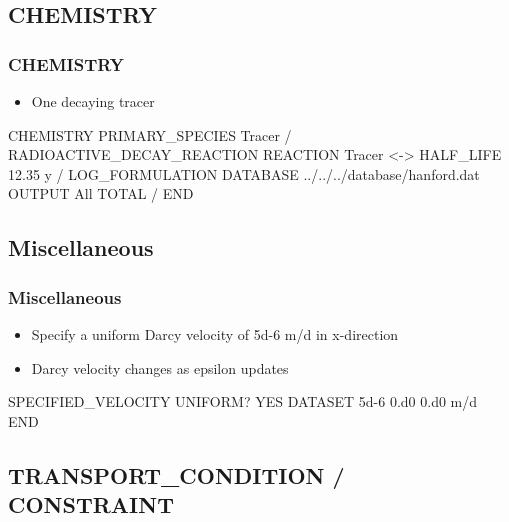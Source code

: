 \documentclass{beamer}
\begin{document}
\subsection{CHEMISTRY}

\begin{frame}\frametitle{CHEMISTRY}

\begin{itemize}
\item One decaying tracer
\end{itemize}

\begin{semiverbatim}
CHEMISTRY
  PRIMARY_SPECIES
     Tracer
  /
  RADIOACTIVE_DECAY_REACTION
    REACTION Tracer <->
    HALF_LIFE 12.35 y
  /
  LOG_FORMULATION
  DATABASE ../../../database/hanford.dat
  OUTPUT
    All
    TOTAL
  /
END
\end{semiverbatim}

\end{frame}

\subsection{Miscellaneous}

\begin{frame}[fragile]\frametitle{Miscellaneous}

\begin{itemize}
\item Specify a uniform Darcy velocity of 5d-6 m/d in x-direction
\item Darcy velocity changes as epsilon updates
\end{itemize}


\begin{semiverbatim}

SPECIFIED_VELOCITY
  UNIFORM? YES
  DATASET 5d-6 0.d0 0.d0 m/d
END
\end{semiverbatim}

\end{frame}


\subsection{TRANSPORT\_CONDITION / CONSTRAINT}
\end{document}
